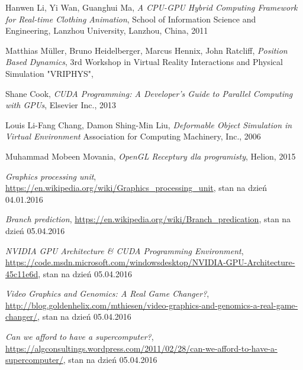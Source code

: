 \begin{thebibliography}{999}

 Hanwen Li, Yi Wan, Guanghui Ma, \emph{A CPU-GPU Hybrid Computing Framework for Real-time Clothing Animation}, School of Information Science and Engineering, Lanzhou University, Lanzhou, China, 2011

 Matthias Müller, Bruno Heidelberger, Marcus Hennix, John Ratcliff, \emph{Position Based Dynamics}, 3rd Workshop in Virtual Reality Interactions and Physical Simulation "VRIPHYS", 

 Shane Cook, \emph{CUDA Programming: A Developer's Guide to Parallel Computing with GPUs}, Elsevier Inc., 2013

 Louis Li-Fang Chang, Damon Shing-Min Liu, \emph{Deformable Object Simulation in Virtual Environment} Association for Computing Machinery, Inc., 2006

 Muhammad Mobeen Movania, \emph{OpenGL Receptury dla programisty}, Helion, 2015

 \emph{Graphics processing unit}, \href{https://en.wikipedia.org/wiki/Graphics\_processing\_unit}{https://en.wikipedia.org/wiki/Graphics\_processing\_unit}, stan na dzień 04.01.2016

 \emph{Branch prediction}, \href{https://en.wikipedia.org/wiki/Branch\_predication}{https://en.wikipedia.org/wiki/Branch\_predication}, stan na dzień 05.04.2016

 \emph{NVIDIA GPU Architecture \& CUDA Programming Environment}, \linebreak \href{https://code.msdn.microsoft.com/windowsdesktop/NVIDIA-GPU-Architecture-45c11e6d}{https://code.msdn.microsoft.com/windowsdesktop/NVIDIA-GPU-Architecture-45c11e6d}, stan na dzień 05.04.2016

 \emph{Video Graphics and Genomics: A Real Game Changer?}, \linebreak \href{http://blog.goldenhelix.com/mthiesen/video-graphics-and-genomics-a-real-game-changer/}{http://blog.goldenhelix.com/mthiesen/video-graphics-and-genomics-a-real-game-changer/}, stan na dzień 05.04.2016

 \emph{Can we afford to have a supercomputer?}, \linebreak \href{https://algconsultings.wordpress.com/2011/02/28/can-we-afford-to-have-a-supercomputer/}{https://algconsultings.wordpress.com/2011/02/28/can-we-afford-to-have-a-supercomputer/}, stan na dzień 05.04.2016

\end{thebibliography}
